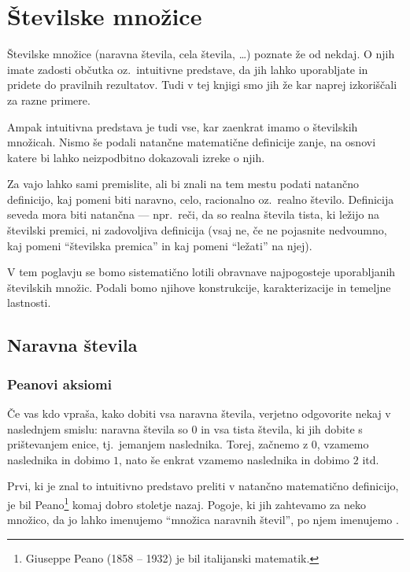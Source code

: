\chapter{Številske množice}

Številske množice (naravna števila, cela števila, \ldots) poznate že od nekdaj. O njih imate zadosti občutka oz.~intuitivne predstave, da jih lahko uporabljate in pridete do pravilnih rezultatov. Tudi v tej knjigi smo jih že kar naprej izkoriščali za razne primere.

Ampak intuitivna predstava je tudi vse, kar zaenkrat imamo o številskih množicah. Nismo še podali natančne matematične definicije zanje, na osnovi katere bi lahko neizpodbitno dokazovali izreke o njih.

Za vajo lahko sami premislite, ali bi znali na tem mestu podati natančno definicijo, kaj pomeni biti naravno, celo, racionalno oz.~realno število. Definicija seveda mora biti natančna --- npr.~reči, da so realna števila tista, ki ležijo na številski premici, ni zadovoljiva definicija (vsaj ne, če ne pojasnite nedvoumno, kaj pomeni ``številska premica'' in kaj pomeni ``ležati'' na njej).

V tem poglavju se bomo sistematično lotili obravnave najpogosteje uporabljanih številskih množic. Podali bomo njihove konstrukcije, karakterizacije in temeljne lastnosti.


\section{Naravna števila}

\subsection{Peanovi aksiomi}

Če vas kdo vpraša, kako dobiti vsa naravna števila, verjetno odgovorite nekaj v naslednjem smislu: naravna števila so $0$ in vsa tista števila, ki jih dobite s prištevanjem enice, tj.~jemanjem naslednika. Torej, začnemo z $0$, vzamemo naslednika in dobimo $1$, nato še enkrat vzamemo naslednika in dobimo $2$ itd.

Prvi, ki je znal to intuitivno predstavo preliti v natančno matematično definicijo, je bil Peano\footnote{Giuseppe Peano (1858 -- 1932) je bil italijanski matematik.} komaj dobro stoletje nazaj. Pogoje, ki jih zahtevamo za neko množico, da jo lahko imenujemo ``množica naravnih števil'', po njem imenujemo . 

